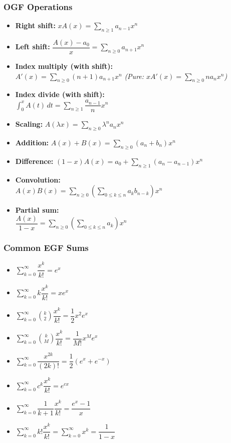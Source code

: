 \subsubsection*{OGF Operations}
\begin{itemize}
    \item \textbf{Right shift:} $x A(x) = \sum_{n \ge 1} a_{n - 1} x^n$
    \item \textbf{Left shift:} $\dfrac{A(x) - a_0}{x} = \sum_{n \ge 0} a_{n + 1} x^n$
    \item \textbf{Index multiply (with shift):} \\ $A'(x) = \sum_{n \ge 0} (n + 1) a_{n + 1} x^n$ \quad \textit{(Pure: $x A'(x) = \sum_{n \ge 0} n a_n x^n$)}
    \item \textbf{Index divide (with shift):} \\ $\int_0^x A(t) \, dt = \sum_{n \ge 1} \dfrac{a_{n - 1}}{n} x^n$
    \item \textbf{Scaling:} $A(\lambda x) = \sum_{n \ge 0} \lambda^n a_n x^n$
    \item \textbf{Addition:} $A(x) + B(x) = \sum_{n \ge 0} (a_n + b_n) x^n$
    \item \textbf{Difference:} $(1 - x) A(x) = a_0 + \sum_{n \ge 1} (a_n - a_{n - 1}) x^n$
    \item \textbf{Convolution:} \\ $A(x) B(x) = \sum_{n \ge 0} \left( \sum_{0 \le k \le n} a_k b_{n - k} \right) x^n$
    \item \textbf{Partial sum:} \\ $\dfrac{A(x)}{1 - x} = \sum_{n \ge 0} \left( \sum_{0 \le k \le n} a_k \right) x^n$
\end{itemize}

\subsubsection*{Common EGF Sums}
\begin{itemize}
    \item $\displaystyle \sum_{k = 0}^{\infty} \dfrac{x^k}{k!} = e^x$
    \item $\displaystyle \sum_{k = 0}^{\infty} k \dfrac{x^k}{k!} = x e^x$
    \item $\displaystyle \sum_{k = 0}^{\infty} \binom{k}{2} \dfrac{x^k}{k!} = \dfrac{1}{2} x^2 e^x$
    \item $\displaystyle \sum_{k = 0}^{\infty} \binom{k}{M} \dfrac{x^k}{k!} = \dfrac{1}{M!} x^M e^x$
    \item $\displaystyle \sum_{k = 0}^{\infty} \dfrac{x^{2k}}{(2k)!} = \dfrac{1}{2}(e^x + e^{-x})$
    \item $\displaystyle \sum_{k = 0}^{\infty} c^k \dfrac{x^k}{k!} = e^{cx}$
    \item $\displaystyle \sum_{k = 0}^{\infty} \dfrac{1}{k + 1} \dfrac{x^k}{k!} = \dfrac{e^x - 1}{x}$
    \item $\displaystyle \sum_{k = 0}^{\infty} k! \dfrac{x^k}{k!} = \sum_{k = 0}^{\infty} x^k = \dfrac{1}{1 - x}$
\end{itemize}


